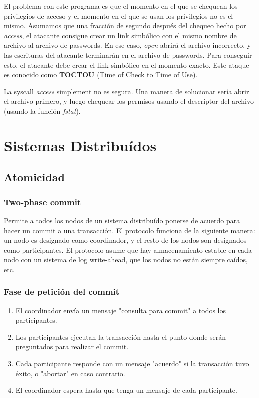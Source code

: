 El problema con este programa es que el momento en el que se chequean los privilegios de acceso y el momento en el que se usan los privilegios no es el mismo. Asumamos que una fracción de segundo después del chequeo hecho por \textit{access}, el atacante consigue crear un link simbólico con el mismo nombre de archivo al archivo de passwords. En ese caso, \textit{open} abrirá el archivo incorrecto, y las escrituras del atacante terminarán en el archivo de passwords. Para conseguir esto, el atacante debe crear el link simbólico en el momento exacto. Este ataque es conocido como \textbf{TOCTOU} (Time of Check to Time of Use).

La syscall \textit{access} simplement no es segura. Una manera de solucionar sería abrir el archivo primero, y luego chequear los permisos usando el descriptor del archivo (usando la función \textit{fstat}).



\newpage
\section{Sistemas Distribuídos}

\subsection{Atomicidad}
\subsubsection{Two-phase commit}

Permite a todos los nodos de un sistema distribuído ponerse de acuerdo para hacer un commit a una transacción. El protocolo funciona de la siguiente manera: un nodo es designado como coordinador, y el resto de los nodos son designados como participantes. El protocolo asume que hay almacenamiento estable en cada nodo con un sistema de log write-ahead, que los nodos no están siempre caídos, etc.

\subsubsection{Fase de petición del commit}

\begin{enumerate}[1]
\item El coordinador envía un mensaje "consulta para commit" a todos los participantes.
\item Los participantes ejecutan la transacción hasta el punto donde serán preguntados para realizar el commit.
\item Cada participante responde con un mensaje "acuerdo" si la transacción tuvo éxito, o "abortar" en caso contrario.
\item El coordinador espera hasta que tenga un mensaje de cada participante.
\end{enumerate}


